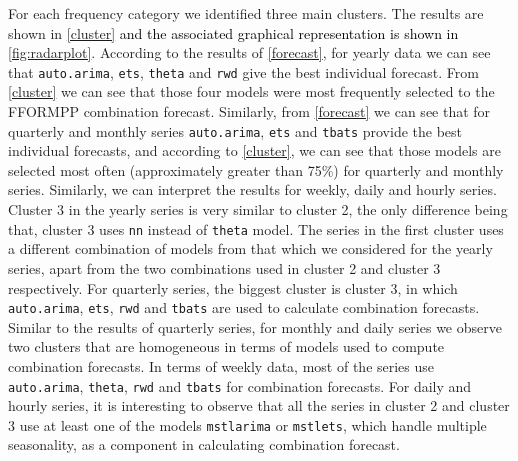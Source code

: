 \documentclass[11pt,a4paper,]{article}
\begin{document}
For each frequency category we identified three main clusters. The results are shown in \autoref{cluster} \textcolor{black}{and the associated graphical representation is shown in} \autoref{fig:radarplot}. According to the results of \autoref{forecast}, for yearly data we can see that \texttt{auto.arima}, \texttt{ets}, \texttt{theta} and \texttt{rwd} give the best individual forecast. From \autoref{cluster} we can see that those four models were most frequently selected to the FFORMPP combination forecast. Similarly, from \autoref{forecast} we can see that for quarterly and monthly series \texttt{auto.arima}, \texttt{ets} and \texttt{tbats} provide the best individual forecasts, and according to \autoref{cluster}, we can see that those models are selected most often (approximately greater than 75\%) for quarterly and monthly series. Similarly, we can interpret the results for weekly, daily and hourly series. Cluster 3 in the yearly series is very similar to cluster 2, the only difference being that, cluster 3 uses \texttt{nn} instead of \texttt{theta} model. The series in the first cluster uses a different combination of models from that which we considered for the yearly series, apart from the two combinations used in cluster 2 and cluster 3 respectively. For quarterly series, the biggest cluster is cluster 3, in which \texttt{auto.arima}, \texttt{ets}, \texttt{rwd} and \texttt{tbats} are used to calculate combination forecasts. Similar to the results of quarterly series, for monthly and daily series we observe two clusters that are homogeneous in terms of models used to compute combination forecasts. In terms of weekly data, most of the series use \texttt{auto.arima}, \texttt{theta}, \texttt{rwd} and \texttt{tbats} for combination forecasts. For daily and hourly series, it is interesting to observe that all the series in cluster 2 and cluster 3 use at least one of the models \texttt{mstlarima} or \texttt{mstlets}, which handle multiple seasonality, as a component in calculating combination forecast.
\end{document}
